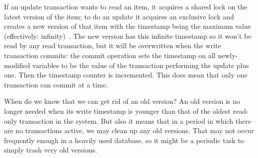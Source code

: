 If an update transaction wants to read an item, it acquires a shared lock on the latest version of the item; to do an update it acquires an exclusive lock and creates a new version of that item with the timestamp being the maximum value (effectively: infinity)~\cite{dsc}. The new version has this infinite timestamp so it won't be read by any read transaction, but it will be overwritten when the write transaction commits:  the commit operation sets the timestamp on all newly-modified variables to be the value of the transaction performing the update plus one. Then the timestamp counter is incremented. This does mean that only one transaction can commit at a time.

When do we know that we can get rid of an old version? An old version is no longer needed when its write timestamp is younger than that of the oldest read-only transaction in the system. But also it means that in a period in which there are no transactions active, we may clean up any old versions. That may not occur frequently enough in a heavily used database, so it might be a periodic task to simply trash very old versions.




